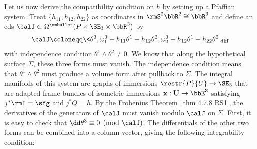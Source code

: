 Let us now derive the compatibility condition on $h$ by setting up a Pfaffian system. Treat $\{h_{11},h_{12},h_{22}\}$ as coordinates in $\rmS^2 \bbR^2\cong\bbR^3$ and define an \gls{eds} $\calJ\subset \Omega^{\smbullet }(P\times \SE_3\times \bbR^3)$ by
\[\calJ\coloneqq \<\theta^3,\omega_1^3-h_{11}\theta^1-h_{12}\theta^2,\omega_2^3-h_{12}\theta^1-h_{22}\theta^2\>_{\mathrm{diff}}\]
with independence condition $\theta^1\wedge\theta^2\neq 0$.
We know that along the hypothetical surface $\Sigma$, these three forms must vanish. The independence condition means that $\theta^1\wedge\theta^2$ must produce a volume form after pullback to $\Sigma$. The integral manifolds of this system are graphs of immersions $\restr{P}{U}\to \SE_3$ that are adapted frame bundles of isometric immersions $\bf{x}:U\to \bbE^3$ satisfying $j^\ast \rmI=\sfg$ and $j^\ast Q=h$. By the Frobenius Theorem~\ref{thm 4.7.8 RS1}, the derivatives of the generators of $\calJ$ must vanish modulo $\calJ$ on $\Sigma$. First, it is easy to check that $\dd\theta^3\equiv 0 \pmod{\calJ}$. The differentials of the other two forms can be combined into a column-vector, giving the following integrability condition:
